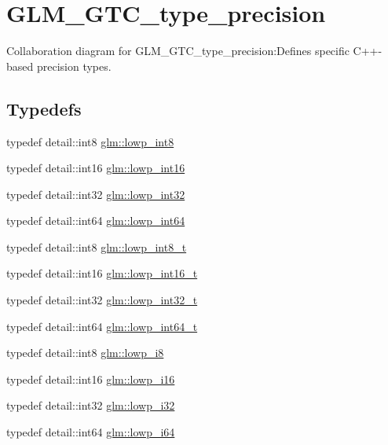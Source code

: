 \hypertarget{group__gtc__type__precision}{
\section{GLM\_\-GTC\_\-type\_\-precision}
\label{group__gtc__type__precision}
}


Collaboration diagram for GLM\_\-GTC\_\-type\_\-precision:Defines specific C++-based precision types.  
\subsection*{Typedefs}
\begin{CompactItemize}
\item 
typedef detail::int8 \hyperlink{group__gtc__type__precision_gf9e675b6392764242ae87eb179e9d3d6}{glm::lowp\_\-int8}
\item 
typedef detail::int16 \hyperlink{group__gtc__type__precision_g71fc0c399fa4780507748b643733f153}{glm::lowp\_\-int16}
\item 
typedef detail::int32 \hyperlink{group__gtc__type__precision_gd9939c9d6fec1c6accc02a83c6500f08}{glm::lowp\_\-int32}
\item 
typedef detail::int64 \hyperlink{group__gtc__type__precision_gb8a8e75af347592406e41b3ae2c0712b}{glm::lowp\_\-int64}
\item 
typedef detail::int8 \hyperlink{group__gtc__type__precision_ge6092311f6970a305c2df19a372360a3}{glm::lowp\_\-int8\_\-t}
\item 
typedef detail::int16 \hyperlink{group__gtc__type__precision_ge34c3d53c4c1434fc9f26538b0185667}{glm::lowp\_\-int16\_\-t}
\item 
typedef detail::int32 \hyperlink{group__gtc__type__precision_gd9567c806dc39f534174eef42663119d}{glm::lowp\_\-int32\_\-t}
\item 
typedef detail::int64 \hyperlink{group__gtc__type__precision_g14d72e76d57c7f28eca8e933816c9fd6}{glm::lowp\_\-int64\_\-t}
\item 
typedef detail::int8 \hyperlink{group__gtc__type__precision_ga2e13ee29c90f75658beed6082541097}{glm::lowp\_\-i8}
\item 
typedef detail::int16 \hyperlink{group__gtc__type__precision_gf7bbfd31bcec25a416ea94d09efb5451}{glm::lowp\_\-i16}
\item 
typedef detail::int32 \hyperlink{group__gtc__type__precision_g70fd34e8b8cffc92739161284ed77328}{glm::lowp\_\-i32}
\item 
typedef detail::int64 \hyperlink{group__gtc__type__precision_g1f4ded25f71c0f3b4518936d50b54b6e}{glm::lowp\_\-i64}

\end{CompactItemize}
